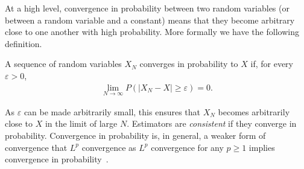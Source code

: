 At a high level, convergence in probability between two random variables (or between a random variable and
a constant) means that they become arbitrary close to one another with high probability.  More
formally we have the following definition.
\begin{definition}
A sequence of random variables $X_N$ converges in probability to $X$ if, for every $\varepsilon>0$,
\begin{align}
\lim\limits_{N\rightarrow\infty} P(\left|X_N-X\right|\ge\varepsilon)=0.
\end{align}
\end{definition}
As $\varepsilon$ can be made arbitrarily small, this ensures that $X_N$ becomes arbitrarily
close to $X$ in the limit of large $N$.  Estimators are \emph{consistent} if they converge
in probability.
Convergence in probability is, in general, a weaker form of convergence that $L^p$ convergence
as $L^p$ convergence for any $p\ge1$ implies convergence in probability~\citep{williams1991probability}.

